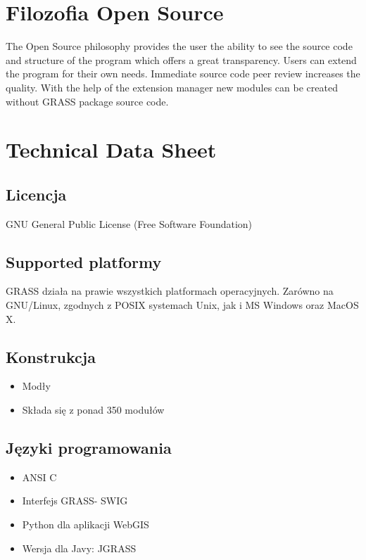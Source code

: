 \documentclass[notumble,a4paper,10pt,nofoldmark]{leaflet}
\begin{document}
\section{Filozofia Open Source}

The Open Source philosophy provides the user the ability to see the source code and structure of the program which offers a great transparency. Users can extend the program for their own needs. Immediate source code peer review increases the quality. With the help of the extension manager new modules can be created without GRASS package source code.

\section{Technical Data Sheet}

\subsection{Licencja}

GNU General Public License (Free Software Foundation)

\subsection{Supported platformy}

GRASS działa na prawie wszystkich platformach operacyjnych. Zarówno na GNU/Linux, zgodnych z POSIX systemach Unix, jak i MS Windows oraz MacOS X.

\subsection{Konstrukcja}

\begin{itemize}
\item Modły
\item Składa się z ponad 350 modułów
\end{itemize}

\subsection{Języki programowania}

\begin{itemize}
\item ANSI C
\item Interfejs GRASS- SWIG
\item Python dla aplikacji WebGIS
\item Wersja dla Javy: JGRASS
\end{itemize}
\end{document}
